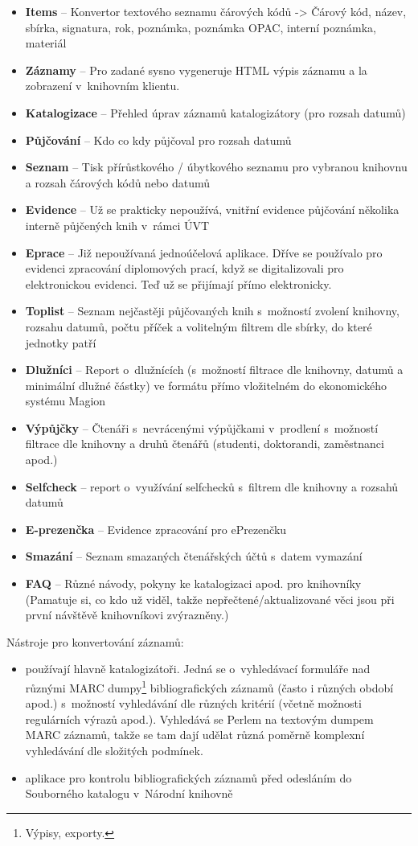 \documentclass[
	11pt, oneside, printed, final, palatino, monochrome
	microtype,
	table,   %
	lof,     %
	lot     %
]{fithesis3}
\newcommand{\bold}[1]{\textbf{#1}}
\begin{document}
{\begin{itemize}
\item \bold{Items} – Konvertor textového seznamu čárových kódů -> Čárový kód, název, sbírka, signatura, rok, poznámka, poznámka OPAC, interní poznámka, materiál
\item \bold{Záznamy} – Pro zadané sysno vygeneruje HTML výpis záznamu a la zobrazení v~knihovním klientu.
\item \bold{Katalogizace} – Přehled úprav záznamů katalogizátory (pro rozsah datumů)
\item \bold{Půjčování} – Kdo co kdy půjčoval pro rozsah datumů
\item \bold{Seznam} – Tisk přírůstkového / úbytkového seznamu pro vybranou knihovnu a rozsah čárových kódů nebo datumů
\item \bold{Evidence} – Už se prakticky nepoužívá, vnitřní evidence půjčování několika interně půjčených knih v~rámci ÚVT
\item \bold{Eprace} – Již nepoužívaná jednoúčelová aplikace. Dříve se používalo pro evidenci zpracování diplomových prací, když se digitalizovali pro elektronickou evidenci. Teď už se přijímají přímo elektronicky.
\item \bold{Toplist} – Seznam nejčastěji půjčovaných knih s~možností zvolení knihovny, rozsahu datumů, počtu příček a volitelným filtrem dle sbírky, do které jednotky patří
\item \bold{Dlužníci} – Report o~dlužnících (s~možností filtrace dle knihovny, datumů a minimální dlužné částky) ve formátu přímo vložitelném do ekonomického systému Magion
\item \bold{Výpůjčky} – Čtenáři s~nevrácenými výpůjčkami v~prodlení s~možností filtrace dle knihovny a druhů čtenářů (studenti, doktorandi, zaměstnanci apod.)
\item \bold{Selfcheck} – report o~využívání selfchecků s~filtrem dle knihovny a rozsahů datumů
\item \bold{E-prezenčka} – Evidence zpracování pro ePrezenčku
\item \bold{Smazání} – Seznam smazaných čtenářských účtů s~datem vymazání
\item \bold{FAQ} – Různé návody, pokyny ke katalogizaci apod. pro knihovníky (Pamatuje si, co kdo už viděl, takže nepřečtené/aktualizované věci jsou při první návštěvě knihovníkovi zvýrazněny.)
\end{itemize}

Nástroje pro konvertování záznamů:

\begin{itemize}
\item používají hlavně katalogizátoři. Jedná se o~vyhledávací formuláře nad různými MARC dumpy\footnote{Výpisy, exporty.} bibliografických záznamů (často i různých období apod.) s~možností vyhledávání dle různých kritérií (včetně možnosti regulárních výrazů apod.). Vyhledává se Perlem na textovým dumpem MARC záznamů, takže se tam dají udělat různá poměrně komplexní vyhledávání dle složitých podmínek. 
\item aplikace pro kontrolu bibliografických záznamů před odesláním do Souborného katalogu v~Národní knihovně
\end{itemize}

}
\end{document}
